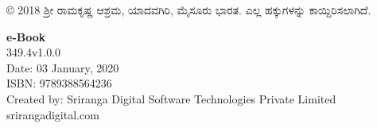 \thispagestyle{empty}

© 2018 ಶ‍್ರೀ ರಾಮಕೃಷ್ಣ ಆಶ್ರಮ, ಯಾದವಗಿರಿ, ಮೈಸೂರು ಭಾರತ. ಎಲ್ಲ ಹಕ್ಕುಗಳನ್ನು ಕಾಯ್ದಿರಿಸಲಾಗಿದೆ.

 \textbf{e-Book}\\
 349.4v1.0.0\\
 Date: 03 January, 2020\\
 ISBN: 9789388564236\\
 Created by: Sriranga Digital Software Technologies Private Limited\\srirangadigital.com



